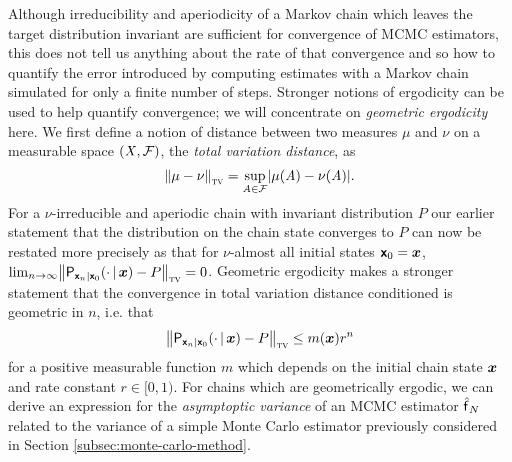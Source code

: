Although irreducibility and aperiodicity of a Markov chain which leaves the target distribution invariant are sufficient for convergence of \ac{MCMC} estimators, this does not tell us anything about the rate of that convergence and so how to quantify the error introduced by computing estimates with a Markov chain simulated for only a finite number of steps. Stronger notions of ergodicity can be used to help quantify convergence; we will concentrate on \emph{geometric ergodicity} here. We first define a notion of distance between two measures $\mu$ and $\nu$ on a measurable space $(\mathit{X},\mathcal{F})$, the \emph{total variation distance}, as
\begin{equation}\label{eq:total-variation-measures}
  \left\Vert \mu - \nu \right\Vert_{\textsc{tv}} = \sup_{\set{A} \in \sset{F}} \left| \mu(\set{A}) - \nu(\set{A}) \right|.
\end{equation}
For a $\nu$-irreducible and aperiodic chain with invariant distribution $P$ our earlier statement that the distribution on the chain state converges to $P$ can now be restated more precisely as that for $\nu$-almost all initial states $\boldsymbol{\mathsf{x}}_0 = \boldsymbol{x}$, $\lim_{n\to\infty} \left\Vert \prob{\rvct{x}_n|\rvct{x}_0}\lpa \cdot \gvn \vct{x}\rpa - \tgtprob \right\Vert_{\textsc{tv}} = 0$. Geometric ergodicity makes a stronger statement that the convergence in total variation distance conditioned is geometric in $n$, i.e. that
\vspace{-2mm}
\begin{equation}\label{eq:geometric-ergodicity}
  \left\Vert \prob{\rvct{x}_n|\rvct{x}_0}\lpa \cdot \gvn \vct{x}\rpa - \tgtprob \right\Vert_{\textsc{tv}} \leq m(\vct{x}) r^n
\end{equation}
for a positive measurable function $m$ which depends on the initial chain state $\boldsymbol{x}$ and rate constant $r \in [0, 1)$. For chains which are geometrically ergodic, we can derive an expression for the \emph{asymptoptic variance} of an \ac{MCMC} estimator $\hatf_N$ related to the variance of a simple Monte Carlo estimator previously considered in Section \ref{subsec:monte-carlo-method}.

